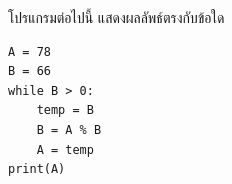 \question โปรแกรมต่อไปนี้ แสดงผลลัพธ์ตรงกับข้อใด
\begin{verbatim}
A = 78
B = 66
while B > 0:
    temp = B
    B = A % B
    A = temp
print(A)
\end{verbatim}
